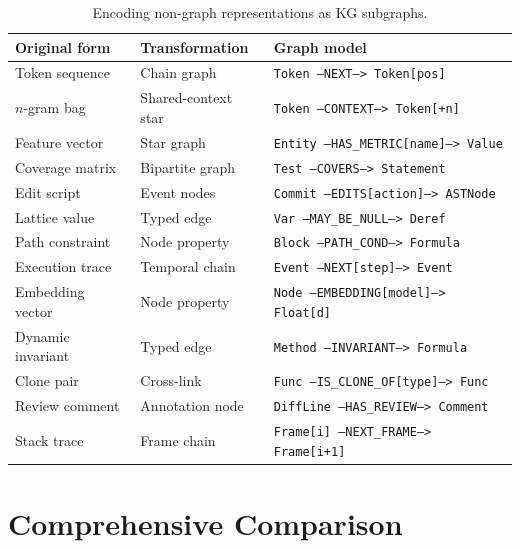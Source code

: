 \documentclass[12pt,a4paper]{article}
\begin{document}
\begin{longtable}{p{3cm}p{4cm}p{5cm}}
\caption{Encoding non-graph representations as KG subgraphs.}
\label{tab:encoding}\\
\toprule
\textbf{Original form} & \textbf{Transformation} & \textbf{Graph model} \\
\midrule
\endhead
Token sequence & Chain graph & \texttt{Token --NEXT--> Token[pos]} \\
$n$-gram bag & Shared-context star & \texttt{Token --CONTEXT--> Token[+n]} \\
Feature vector & Star graph & \texttt{Entity --HAS\_METRIC[name]--> Value} \\
Coverage matrix & Bipartite graph & \texttt{Test --COVERS--> Statement} \\
Edit script & Event nodes & \texttt{Commit --EDITS[action]--> ASTNode} \\
Lattice value & Typed edge & \texttt{Var --MAY\_BE\_NULL--> Deref} \\
Path constraint & Node property & \texttt{Block --PATH\_COND--> Formula} \\
Execution trace & Temporal chain & \texttt{Event --NEXT[step]--> Event} \\
Embedding vector & Node property & \texttt{Node --EMBEDDING[model]--> Float[d]} \\
Dynamic invariant & Typed edge & \texttt{Method --INVARIANT--> Formula} \\
Clone pair & Cross-link & \texttt{Func --IS\_CLONE\_OF[type]--> Func} \\
Review comment & Annotation node & \texttt{DiffLine --HAS\_REVIEW--> Comment} \\
Stack trace & Frame chain & \texttt{Frame[i] --NEXT\_FRAME--> Frame[i+1]} \\
\bottomrule
\end{longtable}

\section{Comprehensive Comparison}
\end{document}
